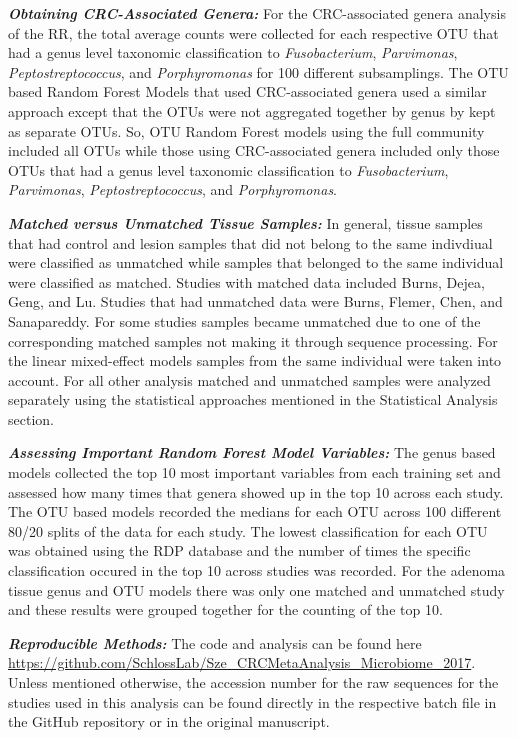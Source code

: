 \documentclass[12pt,]{article}
\begin{document}
\textbf{\emph{Obtaining CRC-Associated Genera:}} For the CRC-associated
genera analysis of the RR, the total average counts were collected for
each respective OTU that had a genus level taxonomic classification to
\emph{Fusobacterium}, \emph{Parvimonas}, \emph{Peptostreptococcus}, and
\emph{Porphyromonas} for 100 different subsamplings. The OTU based
Random Forest Models that used CRC-associated genera used a similar
approach except that the OTUs were not aggregated together by genus by
kept as separate OTUs. So, OTU Random Forest models using the full
community included all OTUs while those using CRC-associated genera
included only those OTUs that had a genus level taxonomic classification
to \emph{Fusobacterium}, \emph{Parvimonas}, \emph{Peptostreptococcus},
and \emph{Porphyromonas}.

\textbf{\emph{Matched versus Unmatched Tissue Samples:}} In general,
tissue samples that had control and lesion samples that did not belong
to the same indivdiual were classified as unmatched while samples that
belonged to the same individual were classified as matched. Studies with
matched data included Burns, Dejea, Geng, and Lu. Studies that had
unmatched data were Burns, Flemer, Chen, and Sanapareddy. For some
studies samples became unmatched due to one of the corresponding matched
samples not making it through sequence processing. For the linear
mixed-effect models samples from the same individual were taken into
account. For all other analysis matched and unmatched samples were
analyzed separately using the statistical approaches mentioned in the
Statistical Analysis section.

\textbf{\emph{Assessing Important Random Forest Model Variables:}} The
genus based models collected the top 10 most important variables from
each training set and assessed how many times that genera showed up in
the top 10 across each study. The OTU based models recorded the medians
for each OTU across 100 different 80/20 splits of the data for each
study. The lowest classification for each OTU was obtained using the RDP
database and the number of times the specific classification occured in
the top 10 across studies was recorded. For the adenoma tissue genus and
OTU models there was only one matched and unmatched study and these
results were grouped together for the counting of the top 10.

\textbf{\emph{Reproducible Methods:}} The code and analysis can be found
here
\url{https://github.com/SchlossLab/Sze_CRCMetaAnalysis_Microbiome_2017}.
Unless mentioned otherwise, the accession number for the raw sequences
for the studies used in this analysis can be found directly in the
respective batch file in the GitHub repository or in the original
manuscript.
\end{document}
